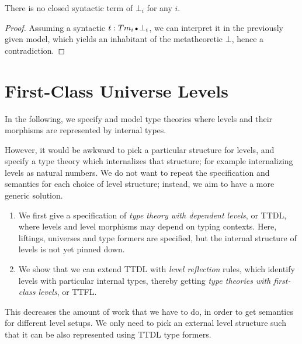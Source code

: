 \documentclass[a4paper,UKenglish,cleveref, autoref, thm-restate]{lipics-v2021}
\theoremstyle{remark}
\theoremstyle{definition}
\newcommand{\Tm}{\mathsf{Tm}}
\newcommand{\emptycon}{\scaleobj{.75}\bullet}
\begin{document}
\begin{theorem}
There is no closed syntactic term of $\bot_i$ for any $i$.
\end{theorem}
\begin{proof}
Assuming a syntactic $t : \Tm_i\,\emptycon\,\bot_i$, we can interpret it in the
previously given model, which yields an inhabitant of the metatheoretic $\bot$,
hence a contradiction.
\end{proof}


\section{First-Class Universe Levels}
\label{sec:ttfl}

In the following, we specify and model type theories where levels and
their morphisms are represented by internal types.

However, it would be awkward to pick a particular structure for levels, and
specify a type theory which internalizes that structure; for example
internalizing levels as natural numbers. We do not want to repeat the
specification and semantics for each choice of level structure; instead, we aim
to have a more generic solution.
\begin{enumerate}
  \item We first give a specification of \emph{type theory with dependent
        levels}, or TTDL, where levels and level morphisms may depend on typing contexts.
        Here, liftings, universes and type formers are specified, but the internal
        structure of levels is not yet pinned down.
  \item We show that we can extend TTDL with \emph{level reflection} rules, which identify
        levels with particular internal types, thereby getting \emph{type theories with first-class
        levels}, or TTFL.
\end{enumerate}
This decreases the amount of work that we have to do, in order to get semantics
for different level setups. We only need to pick an external level structure
such that it can be also represented using TTDL type formers.
\end{document}

